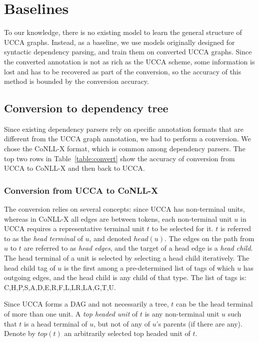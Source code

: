 \documentclass[11pt]{article}
\begin{document}
\section{Baselines}

To our knowledge, there is no existing model to learn the general structure of UCCA graphs. Instead, as a baseline, we use models originally designed for syntactic dependency parsing, and train them on converted UCCA graphs. Since the converted annotation is not as rich as the UCCA scheme, some information is lost and has to be recovered as part of the conversion, so the accuracy of this method is bounded by the conversion accuracy.

\subsection{Conversion to dependency tree}

Since existing dependency parsers rely on specific annotation formats that are different from the UCCA graph annotation, we had to perform a conversion. We chose the CoNLL-X format, which is common among dependency parsers.
The top two rows in Table~\ref{table:convert} show the accuracy of conversion from UCCA to CoNLL-X and then back to UCCA.

\subsubsection{Conversion from UCCA to CoNLL-X}

The conversion relies on several concepts: since UCCA has non-terminal units, whereas in CoNLL-X all edges are between tokens, each non-terminal unit $u$ in UCCA requires a representative terminal unit $t$ to be selected for it. $t$ is referred to as the \textit{head terminal} of $u$, and denoted $head(u)$. The edges on the path from $u$ to $t$ are referred to as \textit{head edges}, and the target of a head edge is a \textit{head child}. The head terminal of a unit is selected by selecting a head child iteratively. The head child tag of $u$ is the first among a pre-determined list of tags of which $u$ has outgoing edges, and the head child is any child of that type. The list of tags is: \textsc{C,H,P,S,A,D,E,R,F,L,LR,LA,G,T,U}.

Since UCCA forms a DAG and not necessarily a tree, $t$ can be the head terminal of more than one unit. A \textit{top headed unit} of $t$ is any non-terminal unit $u$ such that $t$ is a head terminal of $u$, but not of any of $u$'s parents (if there are any). Denote by $top(t)$ an arbitrarily selected top headed unit of $t$.
\end{document}
